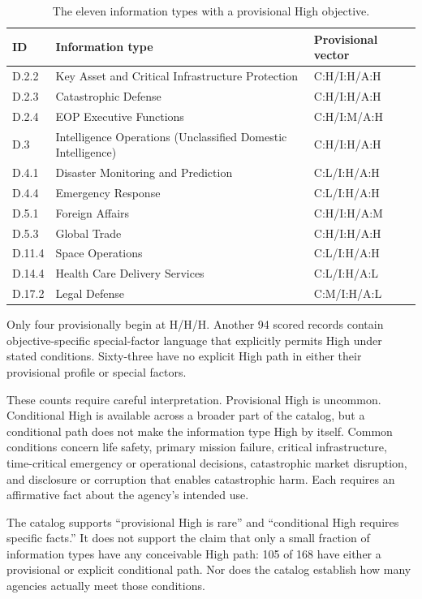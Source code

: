 \documentclass[11pt]{article}
\begin{document}
\begin{table}[H]
\centering
\scriptsize
\renewcommand{\arraystretch}{1.12}
\begin{tabularx}{\textwidth}{@{}P{0.10\textwidth}YP{0.19\textwidth}@{}}
\toprule
\textbf{ID} & \textbf{Information type} & \textbf{Provisional vector} \\
\midrule
D.2.2 & Key Asset and Critical Infrastructure Protection & C:H/I:H/A:H \\
D.2.3 & Catastrophic Defense & C:H/I:H/A:H \\
D.2.4 & EOP Executive Functions & C:H/I:M/A:H \\
D.3 & Intelligence Operations (Unclassified Domestic Intelligence) & C:H/I:H/A:H \\
D.4.1 & Disaster Monitoring and Prediction & C:L/I:H/A:H \\
D.4.4 & Emergency Response & C:L/I:H/A:H \\
D.5.1 & Foreign Affairs & C:H/I:H/A:M \\
D.5.3 & Global Trade & C:H/I:H/A:H \\
D.11.4 & Space Operations & C:L/I:H/A:H \\
D.14.4 & Health Care Delivery Services & C:L/I:H/A:L \\
D.17.2 & Legal Defense & C:M/I:H/A:L \\
\bottomrule
\end{tabularx}
\caption{The eleven information types with a provisional High objective.}
\end{table}

Only four provisionally begin at H/H/H. Another 94 scored records contain
objective-specific special-factor language that explicitly permits High under
stated conditions. Sixty-three have no explicit High path in either their
provisional profile or special factors.

These counts require careful interpretation. Provisional High is uncommon.
Conditional High is available across a broader part of the catalog, but a
conditional path does not make the information type High by itself. Common
conditions concern life safety, primary mission failure, critical infrastructure,
time-critical emergency or operational decisions, catastrophic market disruption,
and disclosure or corruption that enables catastrophic harm. Each requires an
affirmative fact about the agency's intended use.

\begin{boundarybox}
The catalog supports ``provisional High is rare'' and ``conditional High requires
specific facts.'' It does not support the claim that only a small fraction of
information types have any conceivable High path: 105 of 168 have either a
provisional or explicit conditional path. Nor does the catalog establish how many
agencies actually meet those conditions.
\end{boundarybox}
\end{document}
